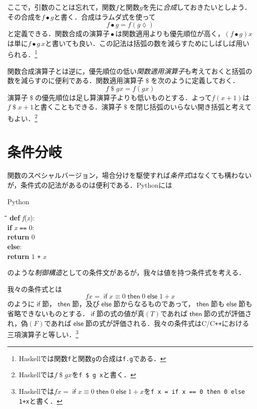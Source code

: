 \documentclass[twocolumn]{jsbook}
\newcommand{\programminglanguage}[1]{\textsf{#1}}
\newcommand{\clang}{\programminglanguage{C}}
\newcommand{\cxx}{\programminglanguage{C}\texttt{++}}
\newcommand{\haskell}{\programminglanguage{Haskell}}
\newcommand{\python}{\programminglanguage{Python}}
\newcommand{\code}[1]{\texttt{#1}}
\newcommand{\keyword}[1]{{\emph{#1}}}
\newenvironment{pythoncode}{\begin{itembox}[r]{\python}}{\end{itembox}}
\newenvironment{pythontab}{\begin{tabbing}\hspace*{1em}\=\hspace*{1em}\=\hspace*{1em}\=\hspace*{1em}\=\kill}{\end{tabbing}}
\newcommand{\pthnId}[1]{\textit{#1}}
\newcommand{\pthnKeyword}[1]{\textbf{#1}}
\newcommand{\pthnOp}[1]{\texttt{#1}}
\newcommand{\mathKeyword}[1]{\mathsf{#1}}
\DeclareMathOperator{\mathApply}{\$}
\DeclareMathOperator{\mathCompose}{\bullet}
\DeclareMathOperator{\mathElse}{\mathKeyword{else}}
\DeclareMathOperator{\mathIf}{\mathKeyword{if}}
\DeclareMathOperator{\mathThen}{\mathKeyword{then}}
\newcommand{\mathLambdaAnonymousParameter}{\lozenge}
\begin{document}
ここで，引数のことは忘れて，関数$f$と関数$g$を先に\keyword{合成}しておきたいとしよう．その合成を$f\mathCompose g$と書く．合成はラムダ式を使って
\begin{equation}
f\mathCompose g=f(g\mathLambdaAnonymousParameter)
\end{equation}
と定義できる．関数合成の演算子$\mathCompose$は関数適用よりも優先順位が高く，$(f\mathCompose g)x$は単に$f\mathCompose g\,x$と書いても良い．この記法は括弧の数を減らすためにしばしば用いられる．\footnote{\haskell では関数\code{f}と関数\code{g}の合成は\code{f.g}である．}

関数合成演算子とは逆に，優先順位の低い\keyword{関数適用演算子}も考えておくと括弧の数を減らすのに便利である．関数適用演算子$\mathApply$を次のように定義しておく．
\begin{equation}
f\mathApply gx=f(gx)
\end{equation}
演算子$\mathApply$の優先順位は足し算演算子よりも低いものとする．よって$f(x+1)$は$f\mathApply x+1$と書くこともできる．演算子$\mathApply$を閉じ括弧のいらない開き括弧と考えてもよい．\footnote{\haskell では$f\mathApply gx$を\code{f \$ g x}と書く．}

\section{条件分岐}
\label{sec:if}

関数のスペシャルバージョン，場合分けを駆使すれば\keyword{条件式}はなくても構わないが，条件式の記法があるのは便利である．\python には
\begin{pythoncode}
\begin{pythontab}
\pthnKeyword{def} \pthnId{f}(\pthnId{x}):\\
\>\pthnKeyword{if} \pthnId{x} \pthnOp{==} $0$:\\
\>\>\pthnKeyword{return} $0$\\
\>\pthnKeyword{else}:\\
\>\>\pthnKeyword{return} $1$ \pthnOp{+} \pthnId{x}
\end{pythontab}
\end{pythoncode}
のような\keyword{制御構造}としての条件文があるが，我々は値を持つ条件式を考える．

我々の条件式とは
\begin{equation}
fx=\mathIf x\equiv0\mathThen0\mathElse1+x
\end{equation}
のように$\mathIf$節，$\mathThen$節，及び$\mathElse$節からなるものであって，$\mathThen$節も$\mathElse$節も省略できないものとする．$\mathIf$節の式の値が真$(T)$であれば$\mathThen$節の式が評価され，偽$(F)$であれば$\mathElse$節の式が評価される．我々の条件式は\clang/\cxx における三項演算子と等しい．\footnote{\haskell では$fx=\mathIf x\equiv0\mathThen0\mathElse1+x$を\code{f x = if x == 0 then 0 else 1+x}と書く．}
\end{document}
